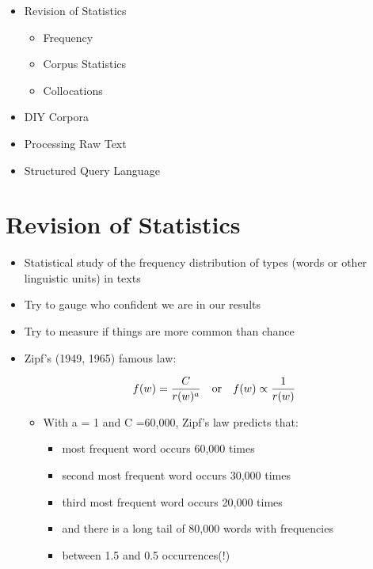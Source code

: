 \documentclass[a4paper,landscape,headrule,footrule,xetex]{foils}
\begin{document}

\maketitle



\begin{itemize} 
\item Revision  of Statistics
  \begin{itemize} 
  \item Frequency
  \item Corpus Statistics
  \item Collocations
\end{itemize}
\item DIY Corpora
\item Processing Raw Text
\item Structured Query Language
\end{itemize}


\section{Revision  of Statistics}



\begin{itemize}
\item Statistical study of the frequency distribution of types
(words or other linguistic units) in texts
\item Try to gauge who confident we are in our results
\item Try to measure if things are more common than chance
\end{itemize}


\begin{itemize}
\item  Zipf’s (1949, 1965) famous law:

  \begin{equation}
    \label{eq:1}
    f(w) = \frac{C}{r(w)^a}\ \ \  \textnormal{or} \ \ \  f(w) \propto \frac{1}{r(w)}
  \end{equation}
\begin{itemize}
  \item With a = 1 and C =60,000, Zipf’s law predicts that:
\begin{itemize}
  \item most frequent word occurs 60,000 times
  \item second most frequent word occurs 30,000 times
  \item third most frequent word occurs 20,000 times
  \item and there is a long tail of 80,000 words with frequencies
  \item between 1.5 and 0.5 occurrences(!)
  \end{itemize}
\end{itemize}
\end{itemize}
\end{document}
